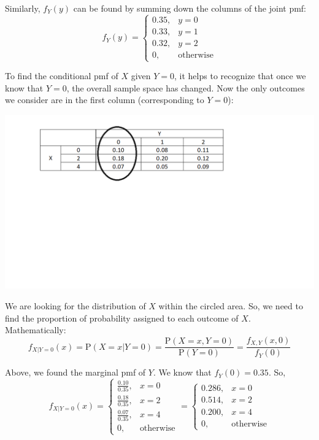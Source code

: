\documentclass[
  letterpaper,
  DIV=11,
  numbers=noendperiod]{scrreprt}
\begin{document}
Similarly, \(f_Y(y)\) can be found by summing down the columns of the
joint pmf: \[
f_Y(y)=\left\{\begin{array}{ll} 0.35, & y=0 \\
0.33, & y=1 \\
0.32, & y=2 \\
0, & \mbox{otherwise} 
\end{array}\right.
\]

To find the conditional pmf of \(X\) given \(Y=0\), it helps to
recognize that once we know that \(Y=0\), the overall sample space has
changed. Now the only outcomes we consider are in the first column
(corresponding to \(Y=0\)):

\begin{center}
\includegraphics{figures/Lesson14Table.png}
\end{center}

We are looking for the distribution of \(X\) within the circled area.
So, we need to find the proportion of probability assigned to each
outcome of \(X\). Mathematically: \[
f_{X|Y=0}(x)=\mbox{P}(X=x|Y=0)=\frac{\mbox{P}(X=x,Y=0)}{\mbox{P}(Y=0)}=\frac{f_{X,Y}(x,0)}{f_Y(0)}
\]

Above, we found the marginal pmf of \(Y\). We know that \(f_Y(0)=0.35\).
So, \[
\renewcommand{\arraystretch}{1.25} 
f_{X|Y=0}(x)=\left\{\begin{array}{ll} \frac{0.10}{0.35}, & x=0 \\
\frac{0.18}{0.35}, & x=2 \\
\frac{0.07}{0.35}, & x=4 \\
0, & \mbox{otherwise} 
\end{array}\right. = \left\{\begin{array}{ll} 0.286, & x=0 \\
0.514, & x=2 \\
0.200, & x=4 \\
0, & \mbox{otherwise} 
\end{array}\right.
\]
\end{document}
